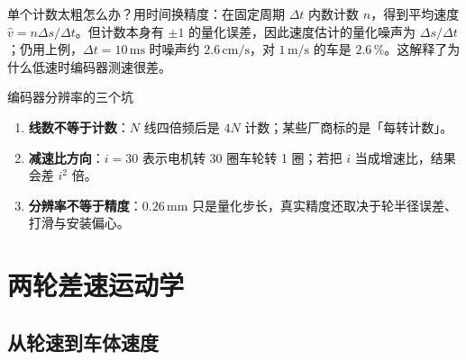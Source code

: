 单个计数太粗怎么办？用时间换精度：在固定周期 $\Delta t$ 内数计数 $n$，得到平均速度 $\hat{v}=n\Delta s/\Delta t$。但计数本身有 $\pm1$ 的量化误差，因此速度估计的量化噪声为 $\Delta s/\Delta t$；仍用上例，$\Delta t=10\,\mathrm{ms}$ 时噪声约 $2.6\,\mathrm{cm/s}$，对 $1\,\mathrm{m/s}$ 的车是 $2.6\,\%$。这解释了为什么低速时编码器测速很差。

\begin{keybox}{编码器分辨率的三个坑}
\begin{enumerate}
  \item \textbf{线数不等于计数}：$N$ 线四倍频后是 $4N$ 计数；某些厂商标的是「每转计数」。
  \item \textbf{减速比方向}：$i=30$ 表示电机转 30 圈车轮转 1 圈；若把 $i$ 当成增速比，结果会差 $i^{2}$ 倍。
  \item \textbf{分辨率不等于精度}：$0.26\,\mathrm{mm}$ 只是量化步长，真实精度还取决于轮半径误差、打滑与安装偏心。
\end{enumerate}
\end{keybox}

\section{两轮差速运动学}\label{sec:05-diff}

\subsection{从轮速到车体速度}

